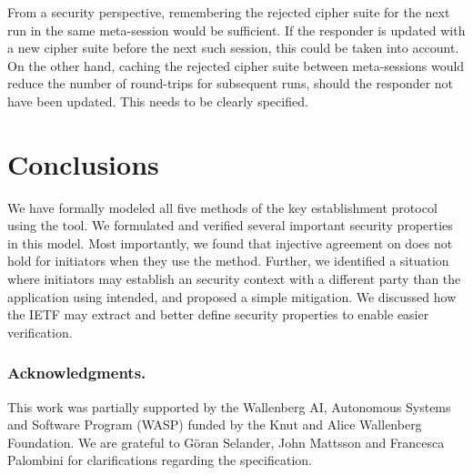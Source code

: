 \documentclass[runningheads, envcountsame, a4paper, draft, x11names]{llncs}
\begin{document}
From a security perspective, remembering the rejected cipher suite for the
next \mEdhoc{} run in the same meta-session would be sufficient.
%
If the responder is updated with a new cipher suite before the next such
session, this could be taken into account. On the other hand, caching the
rejected cipher suite between meta-sessions would reduce the number of
round-trips for subsequent runs, should the responder not have been updated.
%
This needs to be clearly specified.

\section{Conclusions}
\label{sec:conclusions}
We have formally modeled all five
methods of the \mEdhoc{} key establishment protocol using the \mTamarin{} tool.
%
We formulated and verified several important security properties in this model.
%
%
Most importantly, we found that injective agreement on \mGiy{} does not hold for
initiators when they use the \mStat{} method.
%
Further, we identified a situation where initiators may establish an \mOscore{}
security context with a different party than the application using \mEdhoc{}
intended, and proposed a simple mitigation.
%
We discussed how the IETF may extract and better define security properties to
enable easier verification.
%

\subsubsection*{Acknowledgments.} This work was partially supported by
the Wallenberg AI, Autonomous Systems and Software Program (WASP) funded by
the Knut and Alice Wallenberg Foundation.
%
We are grateful to G\"oran Selander, John Mattsson and Francesca Palombini for
clarifications regarding the specification.
%




\end{document}
